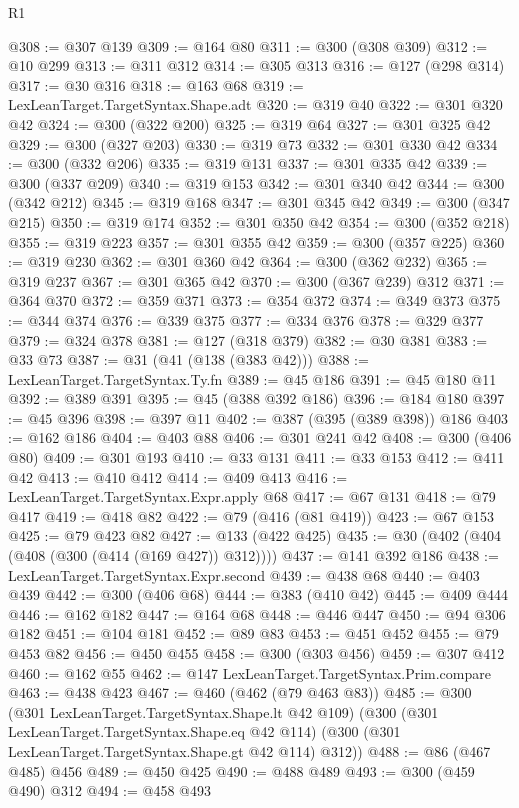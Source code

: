 \begin{lexlean}{R1}
\begin{coremodule}
@308 := @307 @139
@309 := @164 @80
@311 := @300 (@308 @309)
@312 := @10 @299
@313 := @311 @312
@314 := @305 @313
@316 := @127 (@298 @314)
@317 := @30 @316
@318 := @163 @68
@319 := LexLeanTarget.TargetSyntax.Shape.adt
@320 := @319 @40
@322 := @301 @320 @42
@324 := @300 (@322 @200)
@325 := @319 @64
@327 := @301 @325 @42
@329 := @300 (@327 @203)
@330 := @319 @73
@332 := @301 @330 @42
@334 := @300 (@332 @206)
@335 := @319 @131
@337 := @301 @335 @42
@339 := @300 (@337 @209)
@340 := @319 @153
@342 := @301 @340 @42
@344 := @300 (@342 @212)
@345 := @319 @168
@347 := @301 @345 @42
@349 := @300 (@347 @215)
@350 := @319 @174
@352 := @301 @350 @42
@354 := @300 (@352 @218)
@355 := @319 @223
@357 := @301 @355 @42
@359 := @300 (@357 @225)
@360 := @319 @230
@362 := @301 @360 @42
@364 := @300 (@362 @232)
@365 := @319 @237
@367 := @301 @365 @42
@370 := @300 (@367 @239) @312
@371 := @364 @370
@372 := @359 @371
@373 := @354 @372
@374 := @349 @373
@375 := @344 @374
@376 := @339 @375
@377 := @334 @376
@378 := @329 @377
@379 := @324 @378
@381 := @127 (@318 @379)
@382 := @30 @381
@383 := @33 @73
@387 := @31 (@41 (@138 (@383 @42)))
@388 := LexLeanTarget.TargetSyntax.Ty.fn
@389 := @45 @186
@391 := @45 @180 @11
@392 := @389 @391
@395 := @45 (@388 @392 @186)
@396 := @184 @180
@397 := @45 @396
@398 := @397 @11
@402 := @387 (@395 (@389 @398)) @186
@403 := @162 @186
@404 := @403 @88
@406 := @301 @241 @42
@408 := @300 (@406 @80)
@409 := @301 @193
@410 := @33 @131
@411 := @33 @153
@412 := @411 @42
@413 := @410 @412
@414 := @409 @413
@416 := LexLeanTarget.TargetSyntax.Expr.apply @68
@417 := @67 @131
@418 := @79 @417
@419 := @418 @82
@422 := @79 (@416 (@81 @419))
@423 := @67 @153
@425 := @79 @423 @82
@427 := @133 (@422 @425)
@435 := @30 (@402 (@404 (@408 (@300 (@414 (@169 @427)) @312))))
@437 := @141 @392 @186
@438 := LexLeanTarget.TargetSyntax.Expr.second
@439 := @438 @68
@440 := @403 @439
@442 := @300 (@406 @68)
@444 := @383 (@410 @42)
@445 := @409 @444
@446 := @162 @182
@447 := @164 @68
@448 := @446 @447
@450 := @94 @306 @182
@451 := @104 @181
@452 := @89 @83
@453 := @451 @452
@455 := @79 @453 @82
@456 := @450 @455
@458 := @300 (@303 @456)
@459 := @307 @412
@460 := @162 @55
@462 := @147 LexLeanTarget.TargetSyntax.Prim.compare
@463 := @438 @423
@467 := @460 (@462 (@79 @463 @83))
@485 := @300
    (@301 LexLeanTarget.TargetSyntax.Shape.lt @42 @109)
    (@300
      (@301 LexLeanTarget.TargetSyntax.Shape.eq @42 @114)
      (@300 (@301 LexLeanTarget.TargetSyntax.Shape.gt @42 @114) @312))
@488 := @86 (@467 @485) @456
@489 := @450 @425
@490 := @488 @489
@493 := @300 (@459 @490) @312
@494 := @458 @493

\end{coremodule}
\end{lexlean}
